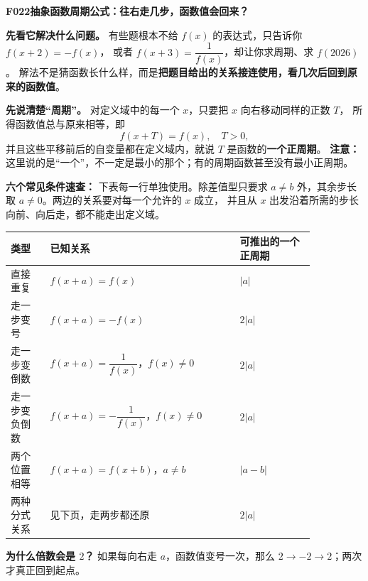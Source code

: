 \begin{statementbox}


\textbf{F022\quad 抽象函数周期公式：往右走几步，函数值会回来？}

\textbf{先看它解决什么问题。} 有些题根本不给 $f(x)$ 的表达式，只告诉你 $f(x+2)=-f(x)$，
或者 $f(x+3)=\dfrac{1}{f(x)}$，却让你求周期、求 $f(2026)$。
解法不是猜函数长什么样，而是\textbf{把题目给出的关系接连使用，看几次后回到原来的函数值}。

\medskip
\textbf{先说清楚“周期”。} 对定义域中的每一个 $x$，只要把 $x$ 向右移动同样的正数 $T$，
所得函数值总与原来相等，即
\[
 \boxed{f(x+T)=f(x),\quad T>0},
\]
并且这些平移前后的自变量都在定义域内，就说 $T$ 是函数的\textbf{一个正周期}。
\textbf{注意：}这里说的是“一个”，不一定是最小的那个；有的周期函数甚至没有最小正周期。

\medskip
\end{statementbox}\clearpage\begin{statementbox}\textbf{六个常见条件速查：} 下表每一行单独使用。除差值型只要求 $a\ne b$ 外，其余步长取 $a\ne0$。两边的关系要对每一个允许的 $x$ 成立，
并且从 $x$ 出发沿着所需的步长向前、向后走，都不能走出定义域。
\begin{center}
\renewcommand{\arraystretch}{1.48}
\begin{tabular}{|p{0.11\linewidth}|p{0.53\linewidth}|p{0.21\linewidth}|}
\hline
类型&已知关系&可推出的一个正周期\\\hline
直接重复 & $f(x+a)=f(x)$ & $|a|$\\\hline
走一步变号 & $f(x+a)=-f(x)$ & $2|a|$\\\hline
走一步变倒数 & $f(x+a)=\dfrac{1}{f(x)}$，$f(x)\ne0$ & $2|a|$\\\hline
走一步变负倒数 & $f(x+a)=-\dfrac{1}{f(x)}$，$f(x)\ne0$ & $2|a|$\\\hline
两个位置相等 & $f(x+a)=f(x+b)$，$a\ne b$ & $|a-b|$\\\hline
两种分式关系 & 见下页，走两步都还原 & $2|a|$\\\hline
\end{tabular}
\end{center}
\textbf{为什么倍数会是 $2$？} 如果每向右走 $a$，函数值变号一次，那么
$2\longrightarrow-2\longrightarrow2$；两次才真正回到起点。

\end{statementbox}

